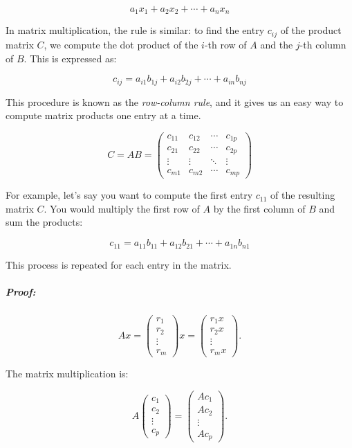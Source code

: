 \documentclass[a4paper,12pt]{article}
\begin{document}
\[
a_1x_1 + a_2x_2 + \cdots + a_nx_n
\]

In matrix multiplication, the rule is similar: to find the entry \( c_{ij} \) of the product matrix \( C \), we compute the dot product of the \( i \)-th row of \( A \) and the \( j \)-th column of \( B \). This is expressed as:

\[
c_{ij} = a_{i1}b_{1j} + a_{i2}b_{2j} + \cdots + a_{in}b_{nj}
\]

This procedure is known as the \textit{row-column rule}, and it gives us an easy way to compute matrix products one entry at a time.

\[
C = AB = \begin{pmatrix} 
c_{11} & c_{12} & \cdots & c_{1p} \\
c_{21} & c_{22} & \cdots & c_{2p} \\
\vdots & \vdots & \ddots & \vdots \\
c_{m1} & c_{m2} & \cdots & c_{mp}
\end{pmatrix}
\]

For example, let’s say you want to compute the first entry \( c_{11} \) of the resulting matrix \( C \). You would multiply the first row of \( A \) by the first column of \( B \) and sum the products:

\[
c_{11} = a_{11}b_{11} + a_{12}b_{21} + \cdots + a_{1n}b_{n1}
\]

This process is repeated for each entry in the matrix.
\subparagraph{Proof:} 
\begin{equation}
A x = 
\begin{pmatrix}
r_1 \\
r_2 \\
\vdots \\
r_m
\end{pmatrix}
x = 
\begin{pmatrix}
r_1 x \\
r_2 x \\
\vdots \\
r_m x
\end{pmatrix}.
\end{equation}

The matrix multiplication is:

\[
A 
\begin{pmatrix}
c_1 \\
c_2 \\
\vdots \\
c_p
\end{pmatrix}
= 
\begin{pmatrix}
A c_1 \\
A c_2 \\
\vdots \\
A c_p
\end{pmatrix}.
\]
\end{document}
